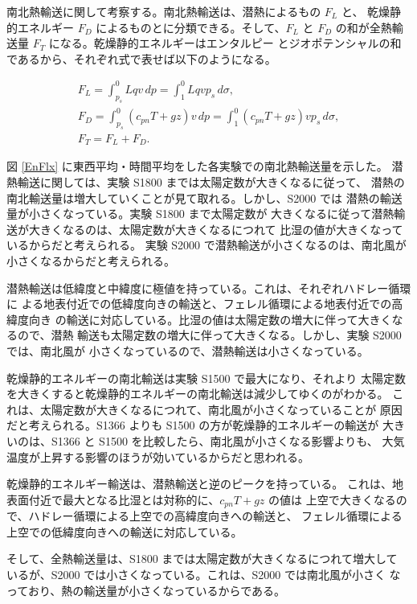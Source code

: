\documentclass[body]{subfiles}
\begin{document}
南北熱輸送に関して考察する。南北熱輸送は、潜熱によるもの \(F_L\) と、
乾燥静的エネルギー \(F_D\) によるものとに分類できる。そして、\(F_L\) と
\(F_D\) の和が全熱輸送量 \(F_T\) になる。乾燥静的エネルギーはエンタルピー
とジオポテンシャルの和であるから、それぞれ式で表せば以下のようになる。

\begin{gather}
	F_L=\int_{p_s}^0 Lqv\,dp=\int_1^0 Lqvp_s\,d\sigma,\\
	F_D=\int_{p_s}^0 (c_{pn}T+gz)v\,dp=\int_1^0 (c_{pn}T+gz)vp_s\,d\sigma,\\
	F_T=F_L+F_D.
\end{gather}

図 \ref{EnFlx} に東西平均・時間平均をした各実験での南北熱輸送量を示した。
潜熱輸送に関しては、実験 S1800 までは太陽定数が大きくなるに従って、
潜熱の南北輸送量は増大していくことが見て取れる。しかし、S2000 では
潜熱の輸送量が小さくなっている。実験 S1800 まで太陽定数が
大きくなるに従って潜熱輸送が大きくなるのは、太陽定数が大きくなるにつれて
比湿の値が大きくなっているからだと考えられる。
実験 S2000 で潜熱輸送が小さくなるのは、南北風が小さくなるからだと考えられる。

潜熱輸送は低緯度と中緯度に極値を持っている。これは、それぞれハドレー循環に
よる地表付近での低緯度向きの輸送と、フェレル循環による地表付近での高緯度向き
の輸送に対応している。比湿の値は太陽定数の増大に伴って大きくなるので、潜熱
輸送も太陽定数の増大に伴って大きくなる。しかし、実験 S2000 では、南北風が
小さくなっているので、潜熱輸送は小さくなっている。

乾燥静的エネルギーの南北輸送は実験 S1500 で最大になり、それより
太陽定数を大きくすると乾燥静的エネルギーの南北輸送は減少してゆくのがわかる。
これは、太陽定数が大きくなるにつれて、南北風が小さくなっていることが
原因だと考えられる。S1366 よりも S1500 の方が乾燥静的エネルギーの輸送が
大きいのは、S1366 と S1500 を比較したら、南北風が小さくなる影響よりも、
大気温度が上昇する影響のほうが効いているからだと思われる。

乾燥静的エネルギー輸送は、潜熱輸送と逆のピークを持っている。
これは、地表面付近で最大となる比湿とは対称的に、\(c_{pn}T+gz\) の値は
上空で大きくなるので、ハドレー循環による上空での高緯度向きへの輸送と、
フェレル循環による上空での低緯度向きへの輸送に対応している。

そして、全熱輸送量は、S1800 までは太陽定数が大きくなるにつれて増大して
いるが、S2000 では小さくなっている。これは、S2000 では南北風が小さく
なっており、熱の輸送量が小さくなっているからである。
\end{document}
